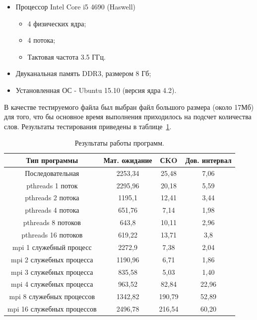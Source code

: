 \documentclass[12pt,a4paper]{report}
\begin{document}
				\begin{itemize}
					\item Процессор Intel Core i5 4690 (Haswell)
						\begin{itemize}
							\item 4 физических ядра;
							\item 4 потока;
							\item Тактовая частота 3.5 ГГц.
						\end{itemize}
					\item Двуканальная память DDR3, размером 8 Гб;
					\item Установленная ОС - Ubuntu 15.10 (версия ядра 4.2).
				\end{itemize}
				В качестве тестируемого файла был выбран файл большого размера (около 
				17Мб) для того, что бы основное время выполнения приходилось на подсчет 
				количества слов. Результаты тестирования приведены в 				
				таблице~\ref{tab:totalTab}.
				\begin{table}[h]
					\caption{\label{tab:totalTab} Результаты работы программ.}
					\begin{center}
						\begin{tabular}{|c|c|c|c|}
							\hline
							\textbf{Тип программы} & \textbf{Мат. ожидание} & \textbf{СKO} & \textbf{Дов. интервал}\\
							\hline
							Последовательная & 2253,34 & 25,48 & 7,06\\
							\hline
							pthreads 1 поток & 2295,96 & 20,18 & 5,59\\
							\hline
							pthreads 2 потока & 1195,1 & 12,41 & 3,44\\
							\hline
							pthreads 4 потока & 651,76 & 7,14 & 1,98\\
							\hline
							pthreads 8 потоков & 643,8 & 10,11 & 2,96\\
							\hline
							pthreads 16 потоков & 619,22 & 13,71 & 3,8\\
							\hline
							mpi 1 служебный процесс & 2272,9 & 7,38 & 2,04\\
							\hline
							mpi 2 служебных процесса & 1190,96 & 6,71 & 1,86\\
							\hline
							mpi 3 служебных процесса & 835,58 & 5,03 & 1,40\\
							\hline
							mpi 4 служебных процесса & 963,52 & 82,84 & 22,96\\
							\hline
							mpi 8 служебных процессов & 1342,82 & 190,79 & 52,89\\
							\hline
							mpi 16 служебных процессов & 2496,78 & 216,54 & 60,20\\
							\hline
						\end{tabular}
					\end{center}
				\end{table}
				
\end{document}
